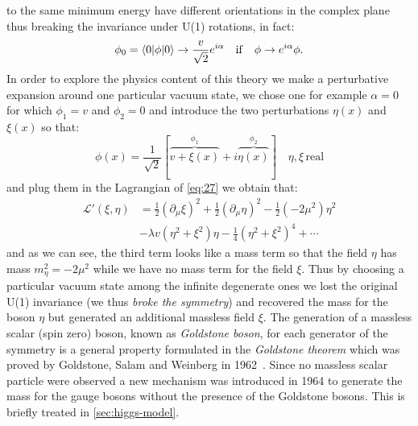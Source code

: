 to the same minimum energy have different orientations in the complex plane thus
breaking the invariance under U(1) rotations, in fact:
\begin{equation}
  \label{eq:29}
  \phi_{0} = \langle 0| \phi |0\rangle \rightarrow \frac{v}{\sqrt{2}} e^{i
    \alpha} \quad \mathrm{if} \quad \phi \rightarrow e^{i \alpha} \phi.
\end{equation}
In order to explore the physics content of this theory we make a perturbative
expansion around one particular vacuum state, we chose one for example
$\alpha = 0$ for which $\phi_{1} = v$ and $\phi_{2} = 0$ and introduce the two
perturbations $\eta(x)$ and $\xi(x)$ so that:
\begin{equation}
  \label{eq:30}
  \phi (x) = \frac{1}{\sqrt{2}} \left[ \overbrace{v + \xi(x)}^{\phi_{1}} + i
    \overbrace{\eta(x)}^{\phi_{2}} \right] \quad \eta,\xi \mathrm{\, real}
\end{equation}
and plug them in the Lagrangian of \cref{eq:27} we obtain that:
\begin{equation}
  \label{eq:31}
  \begin{aligned}
    \mathcal{L}' (\xi,\eta) &= \frac{1}{2}(\partial_{\mu} \xi)^{2} + \frac{1}{2}
    (\partial_{\mu} \eta)^{2} - \frac{1}{2}(-2 \mu^{2})\eta^{2} \\ &- \lambda v
    (\eta^{2} + \xi^{2}) \eta - \frac{1}{4}(\eta^{2} + \xi^{2})^{4} + \cdots
  \end{aligned}
\end{equation}
and as we can see, the third term looks like a mass term so that the field
$\eta$ has mass $m_{\eta}^{2} = -2 \mu^{2}$ while we have no mass term for the
field $\xi$. Thus by choosing a particular vacuum state among the infinite
degenerate ones we lost the original U(1) invariance (we thus \emph{broke the
  symmetry}) and recovered the mass for the boson $\eta$ but generated an
additional massless field $\xi$. The generation of a massless scalar (spin zero)
boson, known as \emph{Goldstone boson}, for each generator of the symmetry is a
general property formulated in the \emph{Goldstone theorem} which was proved by
Goldstone, Salam and Weinberg in 1962~\cite{GoldstoneTheorem}.  Since no
massless scalar particle were observed a new mechanism was introduced in 1964 to
generate the mass for the gauge bosons without the presence of the Goldstone
bosons. This is briefly treated in \ref{sec:higgs-model}.
